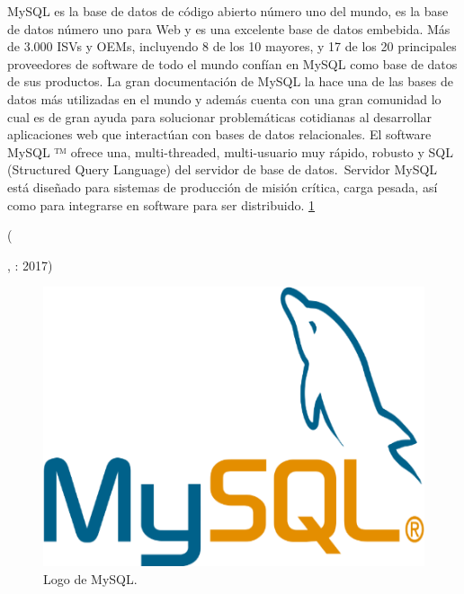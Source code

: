 \begin{center}
  \begin{minipage}{0.9\linewidth}
    \vspace{5pt}%
    {\small
    MySQL es la base de datos de código abierto número uno del mundo, es la base de datos número uno para Web y es una excelente base de datos embebida. Más de 3.000 ISVs y OEMs, incluyendo 8 de los 10 mayores, y 17 de los 20 principales proveedores de software de todo el mundo confían en MySQL como base de datos de sus productos.
    La gran documentación de MySQL la hace una de las bases de datos más utilizadas en el mundo y además cuenta con una gran comunidad lo cual es de gran ayuda para solucionar problemáticas cotidianas al desarrollar aplicaciones web que interactúan con bases de datos relacionales.
    El software MySQL ™ ofrece una, multi-threaded, multi-usuario muy rápido, robusto y SQL (Structured Query Language) del servidor de base de datos. Servidor MySQL está diseñado para sistemas de producción de misión crítica, carga pesada, así como para integrarse en software para ser distribuido. \ref{figura12}
    }
    \begin{flushright}
      (\author{DevCode Blog.},
      : 2017)
    \end{flushright}
      \vspace{5pt}%
  \end{minipage}
\end{center}

\begin{figure}[h]
  \label{figura12}
  \centering
  \includegraphics[scale=1]{lib/assets/12}
  \caption{Logo de MySQL.}
\end{figure}
